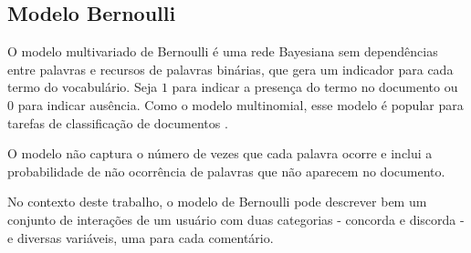 \subsection{Modelo Bernoulli}

O modelo multivariado de Bernoulli é uma rede Bayesiana sem dependências entre palavras e recursos de palavras binárias,
que gera um indicador para cada termo do vocabulário. Seja $1$ para indicar a presença do termo no documento ou $ 0 $ para indicar ausência.
Como o modelo multinomial, esse modelo é popular para tarefas de classificação de documentos \cite{nigam1998}.

O modelo não captura o número de vezes que cada palavra ocorre e inclui a probabilidade de não ocorrência de palavras que não aparecem no documento.

No contexto deste trabalho, o modelo de Bernoulli pode descrever bem um conjunto de interações de um usuário com duas categorias - concorda e discorda - e diversas variáveis, uma para cada comentário.














